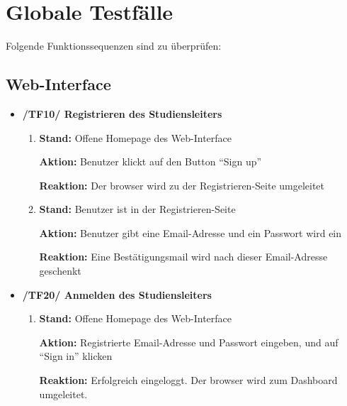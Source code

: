 \documentclass[a4paper]{scrreprt}
\begin{document}
    \chapter{Globale Testfälle}

        Folgende Funktionssequenzen sind zu \"uberpr\"ufen:

        \section{\gls{Web-Interface}}

            \begin{itemize}
                \item \textbf{/TF10/ Registrieren des \gls{Studiensleiter}s}
                    \begin{enumerate}
                        \item \par \textbf{Stand: }Offene Homepage des \gls{Web-Interface}
                            \par \textbf{Aktion: }Benutzer klickt auf den Button ``Sign up''
                            \par \textbf{Reaktion: }Der browser wird zu der Registrieren-Seite umgeleitet
                        \item \par \textbf{Stand: }Benutzer ist in der Registrieren-Seite
                             \par \textbf{Aktion: }Benutzer gibt eine Email-Adresse und ein Passwort wird ein
                             \par \textbf{Reaktion: }Eine Bestätigungsmail wird nach dieser Email-Adresse geschenkt
                   \end{enumerate}

                    \item \textbf{/TF20/ Anmelden des \gls{Studiensleiter}s}
                        \begin{enumerate}
                            \item \par \textbf{Stand: }Offene Homepage des \gls{Web-Interface}
                                \par \textbf{Aktion: }Registrierte Email-Adresse und Passwort eingeben, und auf “Sign in” klicken
                                \par \textbf{Reaktion: }Erfolgreich eingeloggt. Der browser wird zum Dashboard umgeleitet.
                        \end{enumerate}


\end{itemize}
\end{document}
